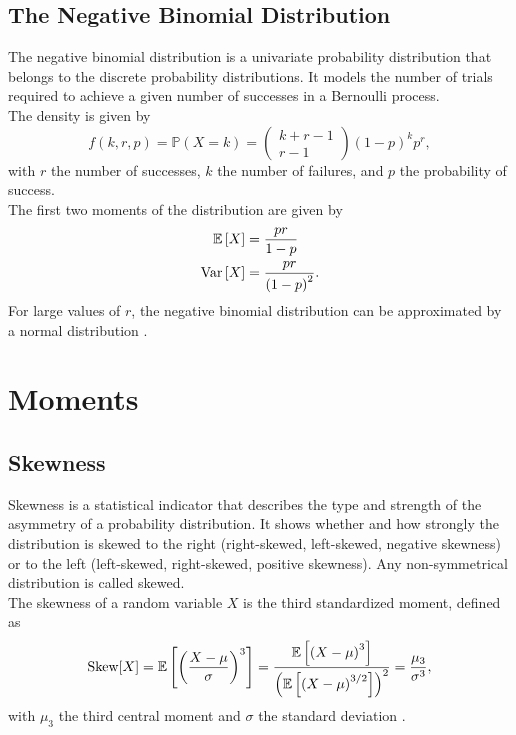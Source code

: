 \subsection{The Negative Binomial Distribution}
The negative binomial distribution is a univariate probability distribution that belongs to the discrete probability distributions. It models the number of trials required to achieve a given number of successes in a Bernoulli process. \\
The density is given by
\begin{equation}
    f\left(k,r,p\right)=\mathbb{P}\left(X=k\right)=\begin{pmatrix} k+r-1\\r-1\end{pmatrix}\left(1-p\right)^kp^r,
\end{equation}
with $r$ the number of successes, $k$ the number of failures, and $p$ the probability of success. \\
The first two moments of the distribution are given by
\begin{align}
    \mathbb{E}\left[X\right] &= \frac{pr}{1-p} \\
    \hbox{Var}\left[X\right] &= \frac{pr}{\left(1-p\right)^2}.
\end{align} 
For large values of $r$, the negative binomial distribution can be approximated by a normal distribution
\autocite[][]{haldane1941fitting}.
\clearpage
\clearpage
\section{Moments}
\subsection{Skewness}
Skewness is a statistical indicator that describes the type and strength of the asymmetry of a probability distribution. It shows whether and how strongly the distribution is skewed to the right (right-skewed, left-skewed, negative skewness) or to the left (left-skewed, right-skewed, positive skewness). Any non-symmetrical distribution is called skewed. \\
The skewness of a random variable $X$ is the third standardized moment, defined as
\begin{equation}\label{eq:skewness}
    \hbox{Skew}[X]=\mathbb{E}\left[\left(\frac{X-\mu}{\sigma}\right)^3\right] = \frac{\mathbb{E}\left[\left(X-\mu\right)^3\right]}{\left(\mathbb{E}\left[\left(X-\mu\right)^{3/2}\right]\right)^2}=\frac{\mu_3}{\sigma^3},
\end{equation}
with $\mu_3$ the third central moment and $\sigma$ the standard deviation \autocite[][]{doane2011measuring, wilkins1944note}.
